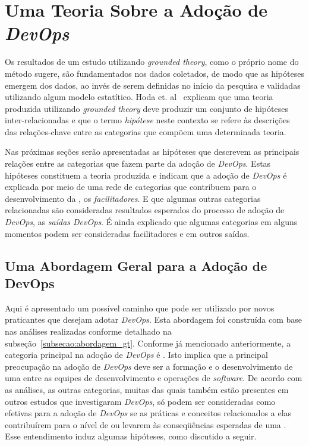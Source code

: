 \section{Uma Teoria Sobre a Adoção de \textit{DevOps}}\label{secao_teoria}

Os resultados de um estudo utilizando {\it grounded theory}, como o próprio
nome do método sugere, são fundamentados nos dados coletados, de modo que as
hipóteses emergem dos dados, ao invés de serem definidas no início da pesquisa
e validadas utilizando algum modelo estatítico. Hoda et. al~\cite{hoda2017becoming}
explicam que uma teoria produzida utilizando \emph{grounded theory} deve produzir
um conjunto de hipóteses inter-relacionadas e que o termo \emph{hipótese} neste
contexto se refere às descrições das relações-chave entre as categorias que
compõem uma determinada teoria.

Nas próximas seções serão apresentadas as hipóteses que descrevem as principais
relações entre as categorias que fazem parte da adoção de {\it DevOps}. Estas
hipóteses constituem a teoria produzida e indicam que a adoção
de {\it DevOps} é explicada por meio de uma rede de categorias que contribuem
para o desenvolvimento da \cc, os \emph{facilitadores}. E que algumas outras
categorias relacionadas são consideradas resultados esperados do processo de
adoção de {\it DevOps}, as \emph{saídas DevOps}. É ainda explicado que algumas
categorias em alguns momentos podem ser consideradas facilitadores e em outros
saídas.

\subsection{Uma Abordagem Geral para a Adoção de DevOps}

Aqui é apresentado um possível caminho que pode ser utilizado por
novos praticantes que desejam adotar {\it DevOps}. Esta abordagem foi construída
com base nas análises realizadas conforme detalhado na subseção~\ref{subsecao:abordagem_gt}.
Conforme já mencionado anteriormente, a categoria principal na adoção de {\it DevOps}
é \cc. Isto implica que a principal preocupação na adoção de {\it DevOps} deve
ser a formação e o desenvolvimento de uma \cc entre as equipes de desenvolvimento
e operações de {\it software}. De acordo com as análises, as outras categorias,
muitas das quais também estão presentes em outros estudos que investigaram
{\it DevOps}, só podem ser consideradas como efetivas para a adoção de {\it DevOps}
se as práticas e conceitos relacionados a elas contribuírem para o nível de \cc
ou levarem às conseqüências esperadas de uma \cc. Esse entendimento induz algumas
hipóteses, como discutido a seguir.

